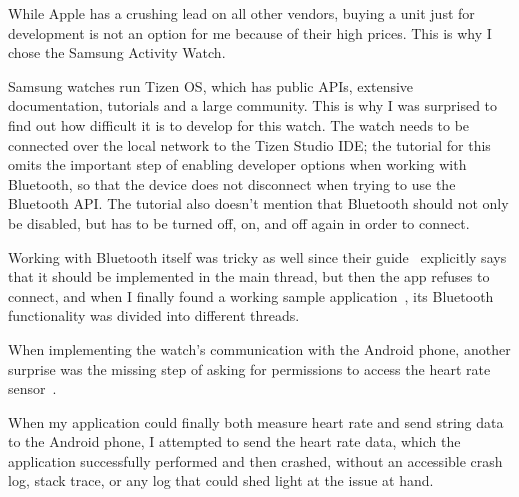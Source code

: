 While Apple has a crushing lead on all other vendors, buying a unit just for development is not an option for me because of their high prices.
This is why I chose the Samsung Activity Watch.

Samsung watches run Tizen OS, which has public APIs, extensive documentation, tutorials and a large community.
This is why I was surprised to find out how difficult it is to develop for this watch.
The watch needs to be connected over the local network to the Tizen Studio IDE; the tutorial for this~\cite{tizen_connect_tutorial} omits the important step of enabling developer options when working with Bluetooth, so that the device does not disconnect when trying to use the Bluetooth API.
The tutorial also doesn't mention that Bluetooth should not only be disabled, but has to be turned off, on, and off again in order to connect.

Working with Bluetooth itself was tricky as well since their guide~\cite{tizen_bluetooth_guide} explicitly says that it should be implemented in the main thread, but then the app refuses to connect, and when I finally found a working sample application~\cite{tizen_bluetooth_sample}, its Bluetooth functionality was divided into different threads.

When implementing the watch's communication with the Android phone, another surprise was the missing step of asking for permissions to access the heart rate sensor~\cite{tizen_sensor_tutorial}.

When my application could finally both measure heart rate and send string data to the Android phone, I attempted to send the heart rate data, which the application successfully performed and then crashed, without an accessible crash log, stack trace, or any log that could shed light at the issue at hand.


